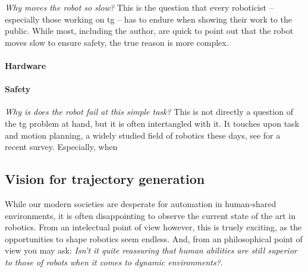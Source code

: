 \textit{Why moves the robot so slow?} This is the question that every roboticist
-- especially those working on \ac{tg} --
has to endure when showing their work to the public. While most, including the
author, are quick to point out that the robot moves slow to ensure safety, the
true reason is more complex.

\paragraph{Hardware}




\paragraph{Safety}

\textit{Why is does the robot fail at this simple task?} This is not directly a
question of the \ac{tg} problem at hand, but it is often intertangled with it.
It touches upon task and motion planning, a widely studied field of robotics
these days, see \cite{garrett2021integrated} for a recent survey. Especially,
when 

\subsection{Vision for trajectory generation}
\label{sec:discussion_vision}

While our modern societies are desperate for automation in human-shared
environments, it is often disappointing to observe the current state of the art
in robotics. From an intelectual point of view however, this is truely exciting,
as the opportunities to shape robotics seem endless. And, from an philosophical
point of view you may ask: \textit{Isn't it quite reassuring that human
abilities are still superior to those of robots when it comes to dynamic
environments?}.
